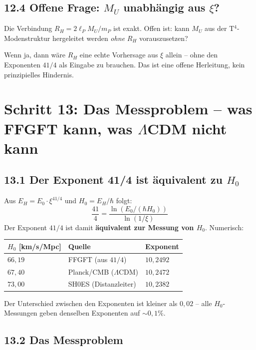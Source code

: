 \subsection*{12.4 Offene Frage: $M_U$ unabhängig aus $\xi$?}

Die Verbindung $R_H = 2\ell_P M_U/m_P$ ist exakt.
Offen ist: kann $M_U$ aus der T$^4$-Modenstruktur hergeleitet werden
\emph{ohne} $R_H$ vorauszusetzen?

Wenn ja, dann wäre $R_H$ eine echte Vorhersage aus $\xi$ allein --
ohne den Exponenten $41/4$ als Eingabe zu brauchen.
Das ist eine offene Herleitung, kein prinzipielles Hindernis.

\section{Schritt 13: Das Messproblem -- was FFGFT kann, was $\Lambda$CDM nicht kann}

\subsection*{13.1 Der Exponent 41/4 ist äquivalent zu $H_0$}

Aus $E_H = E_0 \cdot \xi^{41/4}$ und $H_0 = E_H/\hbar$ folgt:
\[
  \frac{41}{4} = \frac{\ln(E_0/(\hbar H_0))}{\ln(1/\xi)}
\]
Der Exponent $41/4$ ist damit \textbf{äquivalent zur Messung von $H_0$}.
Numerisch:

\begin{center}
\begin{tabular}{lll}
\toprule
$H_0$ [km/s/Mpc] & Quelle & Exponent \\
\midrule
$66{,}19$ & FFGFT (aus $41/4$) & $10{,}2492$ \\
$67{,}40$ & Planck/CMB ($\Lambda$CDM) & $10{,}2472$ \\
$73{,}00$ & SH0ES (Distanzleiter) & $10{,}2382$ \\
\bottomrule
\end{tabular}
\end{center}

Der Unterschied zwischen den Exponenten ist kleiner als $0{,}02$ --
alle $H_0$-Messungen geben denselben Exponenten auf $\sim 0{,}1\%$.

\subsection*{13.2 Das Messproblem}

